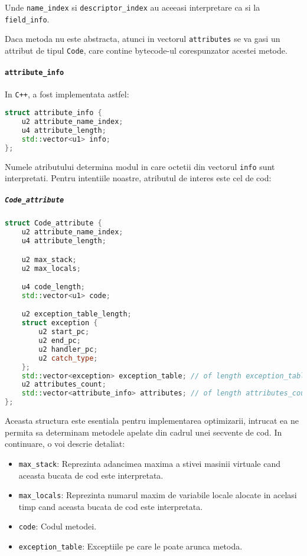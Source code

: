 Unde \texttt{name\_index} si \texttt{descriptor\_index} au aceeasi
interpretare ca si la \texttt{field\_info}.

Daca metoda nu este abstracta, atunci in vectorul \texttt{attributes} se
va gasi un attribut de tipul \texttt{Code}, care contine bytecode-ul
corespunzator acestei metode.

\paragraph{\texorpdfstring{\texttt{attribute\_info}}{attribute\_info}}\label{attribute_info}

In \texttt{C++}, a fost implementata astfel:

\begin{lstlisting}[language=C++]
struct attribute_info {
    u2 attribute_name_index;
    u4 attribute_length;
    std::vector<u1> info;
};
\end{lstlisting}

Numele atributului determina modul in care octetii din vectorul
\texttt{info} sunt interpretati. Pentru intentiile noastre, atributul de
interes este cel de cod:

\subparagraph{\texorpdfstring{\texttt{Code\_attribute}}{Code\_attribute}}\label{code_attribute}

\begin{lstlisting}[language=C++]
struct Code_attribute {
    u2 attribute_name_index;
    u4 attribute_length;

    u2 max_stack;
    u2 max_locals;

    u4 code_length;
    std::vector<u1> code;

    u2 exception_table_length;
    struct exception {
        u2 start_pc;
        u2 end_pc;
        u2 handler_pc;
        u2 catch_type;
    };
    std::vector<exception> exception_table; // of length exception_table_length.
    u2 attributes_count;
    std::vector<attribute_info> attributes; // of length attributes_count.
};
\end{lstlisting}

Aceasta structura este esentiala pentru implementarea
optimizarii, intrucat ea ne permita sa determinam metodele
apelate din cadrul unei secvente de cod.
In continuare, o voi descrie detaliat:

\begin{itemize}
\tightlist
\item
  \texttt{max\_stack}: Reprezinta adancimea maxima a stivei masinii
  virtuale cand aceasta bucata de cod este interpretata.
\item
  \texttt{max\_locals}: Reprezinta numarul maxim de variabile locale
  alocate in acelasi timp cand aceasta bucata de cod este interpretata.
\item
  \texttt{code}: Codul metodei.
\item
  \texttt{exception\_table}: Exceptiile pe care le poate arunca metoda.
\end{itemize}

